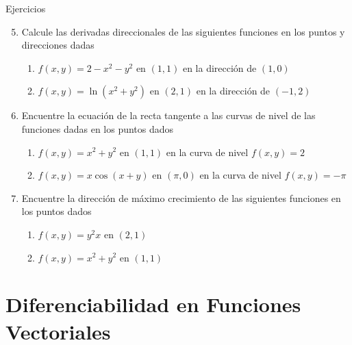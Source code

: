 \begin{frame}{Ejercicios}
  \begin{enumerate}
    \setcounter{enumi}{4}
    \item Calcule las derivadas direccionales de las siguientes funciones en los puntos y direcciones dadas\\[0.25cm]
      \begin{enumerate}
        \item $f(x,y)=2-x^2-y^2$ en $(1,1)$ en la dirección de $(1,0)$
        \item $f(x,y)=\ln(x^2+y^2)$ en $(2,1)$ en la dirección de $(-1,2)$
      \end{enumerate}
    \vspace{0.25cm}
    \item Encuentre la ecuación de la recta tangente a las curvas de nivel de las funciones dadas en los puntos dados\\[0.25cm]
      \begin{enumerate}
        \item $f(x,y)=x^2+y^2$ en $(1,1)$ en la curva de nivel $f(x,y)=2$
        \item $f(x,y)=x\cos(x+y)$ en $(\pi,0)$ en la curva de nivel $f(x,y)=-\pi$
      \end{enumerate}
    \vspace{0.25cm}
    \item Encuentre la dirección de máximo crecimiento de las siguientes funciones en los puntos dados\\[0.25cm]
      \begin{enumerate}
        \item $f(x,y)=y^2x$ en $(2,1)$
        \item $f(x,y)=x^2+y^2$ en $(1,1)$
      \end{enumerate}
  \end{enumerate}
\end{frame}

\section{Diferenciabilidad en Funciones Vectoriales}
\begin{frame}
\sectionpage
\end{frame}

\begin{frame}
\tableofcontents[currentsection]
\end{frame}

